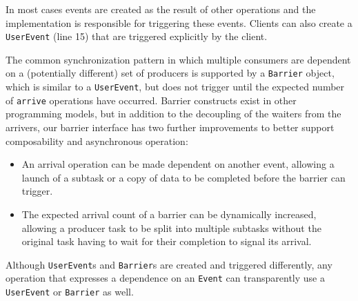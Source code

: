 In most cases events are created as the result of other
operations and the implementation is responsible for triggering these events.  Clients
can also create a {\tt UserEvent} (line 15) that are triggered explicitly by the client.

The common synchronization pattern in which multiple consumers are dependent on a 
(potentially different) set of producers is supported by a {\tt Barrier} object,
which is similar to a {\tt UserEvent}, but does not trigger until the expected
number of {\tt arrive} operations have occurred.  Barrier constructs exist in other
programming models\cite{MPI}, but in addition to the decoupling of the waiters from
the arrivers, our barrier interface has two further improvements to better support
composability and asynchronous operation:
\begin{itemize} \itemsep1pt \parskip0pt 
\item An arrival operation can be made dependent on another event, allowing a launch 
of a subtask or a copy of data to be completed before the barrier can trigger.
\item The expected arrival count of a barrier can be dynamically increased, allowing
a producer task to be split into multiple subtasks without the original task having to wait for
their completion to signal its arrival.
\end{itemize}

Although {\tt UserEvent}s and {\tt Barrier}s are created and triggered differently,
any operation that expresses a dependence on an {\tt Event} can transparently use
a {\tt UserEvent} or {\tt Barrier} as well.


